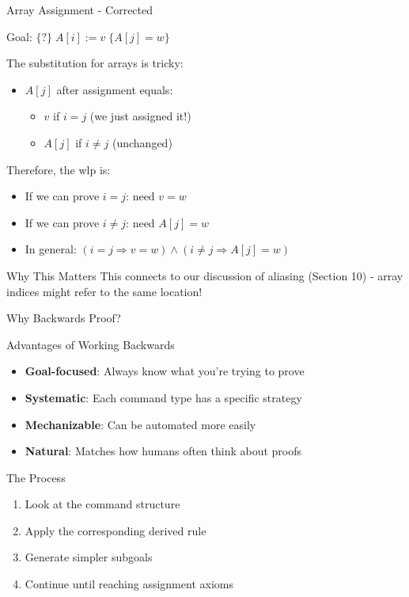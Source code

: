 \begin{frame}{Array Assignment - Corrected}
    \begin{example}
        Goal: $\{?\} \; A[i]:=v \; \{A[j]=w\}$
        
        The substitution for arrays is tricky:
        \begin{itemize}
            \item $A[j]$ after assignment equals:
            \begin{itemize}
                \item $v$ if $i = j$ (we just assigned it!)
                \item $A[j]$ if $i \neq j$ (unchanged)
            \end{itemize}
        \end{itemize}
        
        Therefore, the wlp is:
        \begin{itemize}
            \item If we can prove $i = j$: need $v = w$
            \item If we can prove $i \neq j$: need $A[j] = w$
            \item In general: $(i = j \Rightarrow v = w) \wedge (i \neq j \Rightarrow A[j] = w)$
        \end{itemize}
    \end{example}
    
    \begin{block}{Why This Matters}
        This connects to our discussion of aliasing (Section 10) - array indices might refer to the same location!
    \end{block}
\end{frame}

\begin{frame}{Why Backwards Proof?}
    \begin{block}{Advantages of Working Backwards}
        \begin{itemize}
            \item \textbf{Goal-focused}: Always know what you're trying to prove
            \item \textbf{Systematic}: Each command type has a specific strategy
            \item \textbf{Mechanizable}: Can be automated more easily
            \item \textbf{Natural}: Matches how humans often think about proofs
        \end{itemize}
    \end{block}
    
    \begin{block}{The Process}
        \begin{enumerate}
            \item Look at the command structure
            \item Apply the corresponding derived rule
            \item Generate simpler subgoals
            \item Continue until reaching assignment axioms
        \end{enumerate}
    \end{block}
\end{frame}